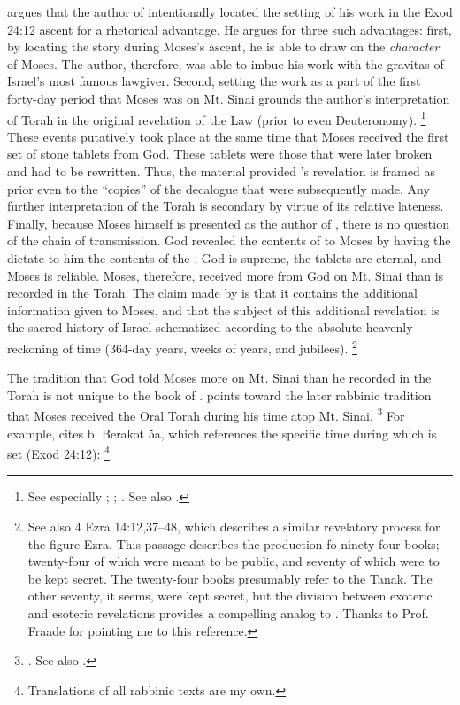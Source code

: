\vanderkam argues that the author of \jub intentionally located the setting of his work in the Exod 24:12 ascent for a rhetorical advantage. He argues for three such advantages: first, by locating the story during Moses's ascent, he is able to draw on the \emph{character} of Moses. The author, therefore, was able to imbue his work with the gravitas of Israel's most famous lawgiver. Second, setting the work as a part of the first forty-day period that Moses was on Mt. Sinai grounds the author's interpretation of Torah in the original revelation of the Law (prior to even Deuteronomy).%
    \footnote{%
        See especially 
        \cite{najman_dsd2000};
        \cite{najman_jsj1999};
        \cite{najman2003}. See also
        \cite{debel_jsj2014}.}
These events putatively took place at the same time that Moses received the first set of stone tablets from God. These tablets were those that were later broken and had to be rewritten. Thus, the material provided \jub's revelation is framed as prior even to the ``copies'' of the decalogue that were subsequently made. Any further interpretation of the Torah is secondary by virtue of its relative lateness. Finally, because Moses himself is presented as the author of \jub, there is no question of the chain of transmission. God revealed the contents of \jub to Moses by having the \ap dictate to him the contents of the \heavenlytablets. God is supreme, the tablets are eternal, and Moses is reliable. Moses, therefore, received more from God on Mt. Sinai than is recorded in the Torah. The claim made by \jub is that it contains the additional information given to Moses, and that the subject of this additional revelation is the sacred history of Israel schematized according to the absolute heavenly reckoning of time (364-day years, weeks of years, and jubilees).%
    \footnote{%
        See also 4 Ezra 14:12,37--48, which describes a similar revelatory process for the figure Ezra. This passage describes the production fo ninety-four books; twenty-four of which were meant to be public, and seventy of which were to be kept secret. The twenty-four books presumably refer to the Tanak. The other seventy, it seems, were kept secret, but the division between exoteric and esoteric revelations provides a compelling analog to \jub. Thanks to Prof. Fraade for pointing me to this reference.}

The tradition that God told Moses more on Mt. Sinai than he recorded in the Torah is not unique to the book of \jub. \vanderkam points toward the later rabbinic tradition that Moses received the Oral Torah during his time atop Mt. Sinai.%
    \footnote{%
        \Cite[28--31]{vanderkam_metso-etal2010}. See also
        \cite{novick_mason-etal2012}.}
For example, \vanderkam cites b. Berakot 5a, which references the specific time during which \jub is set (Exod 24:12):%
    \footnote{Translations of all rabbinic texts are my own.}

